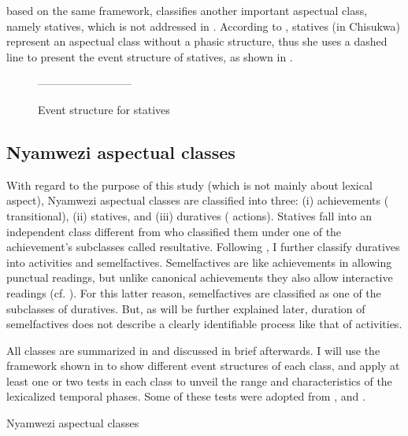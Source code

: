 \documentclass[output=paper,newtxmath,modfonts,nonflat,draftmode]{langsci/langscibook}
\begin{document}
\citet[62]{Kershner2002} based on the same framework, classifies another important aspectual class, namely statives, which is not addressed in \citet{Botne2010}. According to \citet{Kershner2002}, statives (in Chisukwa) represent an aspectual class without a phasic structure, thus she uses a dashed line to present the event structure of statives, as shown in . 

\begin{figure}
--------------------------
\caption{Event structure for statives \citep[62]{Kershner2002}\label{fig:kanijo:4}}
\end{figure}

\subsection{Nyamwezi aspectual classes}

With regard to the purpose of this study (which is not mainly about lexical aspect), Nyamwezi aspectual classes are classified into three: (i) achievements ( transitional), (ii) statives, and (iii) duratives ( actions). Statives fall into an independent class different from \citet{Botne2010} who classified them under one of the achievement’s subclasses called resultative. Following \citet{Botne2010}, I further classify duratives into activities and semelfactives. Semelfactives are like achievements in allowing punctual readings, but unlike canonical achievements they also allow interactive readings (cf. \citealt{Kearns2000}). For this latter reason, semelfactives are classified as one of the subclasses of duratives. But, as will be further explained later, duration of semelfactives does not describe a clearly identifiable process like that of activities. 

All classes are summarized in  and discussed in brief afterwards. I will use the framework shown in  to show different event structures of each class, and apply at least one or two tests in each class to unveil the range and characteristics of the lexicalized temporal phases. Some of these tests were adopted from \citet{Kershner2002}, \citet{Crane2016} and \citet{Persohn2017b}.

\ea \label{ex:kanijo:8}
 Nyamwezi aspectual classes

\z
\end{document}
